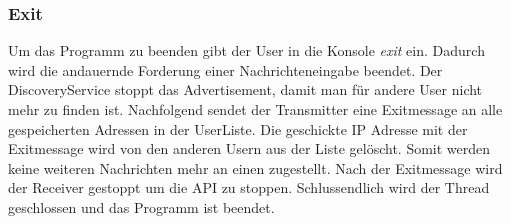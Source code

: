 \subsubsection{Exit}
Um das Programm zu beenden gibt der User in die Konsole \emph{exit} ein. Dadurch wird die andauernde Forderung einer Nachrichteneingabe beendet.
Der DiscoveryService stoppt das Advertisement, damit man für andere User nicht mehr zu finden ist. Nachfolgend sendet der Transmitter eine Exitmessage 
an alle gespeicherten Adressen in der UserListe. Die geschickte IP Adresse mit der Exitmessage wird von den anderen Usern aus der Liste gelöscht. 
Somit werden keine weiteren Nachrichten mehr an einen zugestellt. Nach der Exitmessage wird der Receiver gestoppt um die API zu stoppen. 
Schlussendlich wird der Thread geschlossen und das Programm ist beendet. 